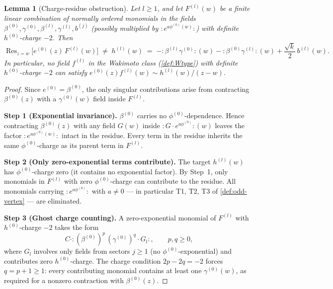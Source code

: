 \documentclass[12pt]{article}
\theoremstyle{plain}
\newtheorem{lemma}[theorem]{Lemma}
\theoremstyle{definition}
\theoremstyle{remark}
\newcommand{\bl}[1]{\beta^{(#1)}}
\newcommand{\gl}[1]{\gamma^{(#1)}}
\newcommand{\el}[1]{e^{(#1)}}
\newcommand{\hl}[1]{h^{(#1)}}
\newcommand{\fl}[1]{f^{(#1)}}
\newcommand{\OPE}{\sim}
\newcommand{\no}[1]{:\!#1\!:}
\begin{document}
\begin{lemma}[Charge-residue obstruction]
\label{lem:charge-residue}
  Let $l\geq 1$, and let $F^{(l)}(w)$ be a finite linear combination of
  normally ordered monomials in the fields
  $\bl{0},\gl{0},\bl{l},\gl{l},b^{(j)}$ (possibly multiplied by
  $\no{e^{a\phi^{(0)}(w)}}$) with definite $h^{(0)}$-charge $-2$.
  Then
  \[
    \operatorname{Res}_{z=w}\bigl[\el{0}(z)\,F^{(l)}(w)\bigr]
    \;\neq\;
    \hl{l}(w)
    \;=\;
    {-}\no{\bl{l}\gl{0}}(w)
    -{}\no{\bl{0}\gl{l}}(w)
    +\frac{\sqrt{k}}{2}\,b^{(l)}(w).
  \]
  In particular, no field $\fl{l}$ in the Wakimoto class
  \textup{(\cref{def:Wtype})} with definite $h^{(0)}$-charge $-2$ can satisfy
  $\el{0}(z)\fl{l}(w)\OPE \hl{l}(w)/(z-w)$.
\end{lemma}

\begin{proof}
  Since $\el{0}=\bl{0}$, the only singular contributions arise from contracting
  $\bl{0}(z)$ with a $\gl{0}(w)$ field inside $F^{(l)}$.

  \textbf{Step 1 (Exponential invariance).}
  $\bl{0}$ carries no $\phi^{(0)}$-dependence.  Hence contracting $\bl{0}(z)$
  with any field $G(w)$ inside $\no{G\cdot e^{a\phi^{(0)}}}(w)$ leaves the factor
  $\no{e^{a\phi^{(0)}(w)}}$ intact in the residue.
  Every term in the residue inherits the same $\phi^{(0)}$-charge as its
  parent term in $F^{(l)}$.

  \textbf{Step 2 (Only zero-exponential terms contribute).}
  The target $\hl{l}(w)$ has $\phi^{(0)}$-charge zero (it contains no
  exponential factor).  By Step~1, only monomials in $F^{(l)}$ with zero
  $\phi^{(0)}$-charge can contribute to the residue.  All monomials carrying
  $\no{e^{a\phi^{(0)}}}$ with $a\neq 0$ — in particular T1, T2, T3 of
  \cref{def:odd-vertex} — are eliminated.

  \textbf{Step 3 (Ghost charge counting).}
  A zero-exponential monomial of $F^{(l)}$ with $h^{(0)}$-charge $-2$ takes the form
  \[
    C\cdot\no{(\bl{0})^p\,(\gl{0})^q\cdot G_l},
    \qquad p,q\geq 0,
  \]
  where $G_l$ involves only fields from sectors $j\geq 1$ (no $\phi^{(0)}$-exponential)
  and contributes zero $h^{(0)}$-charge.
  The charge condition $2p-2q=-2$ forces $q=p+1\geq 1$:
  every contributing monomial contains at least one $\gl{0}(w)$, as required
  for a nonzero contraction with $\bl{0}(z)$.


\end{proof}
\end{document}
